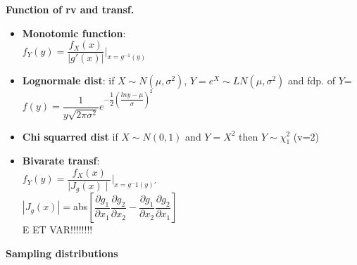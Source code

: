 \documentclass[a4paper, 10pt, landscape]{article}
\begin{document}
\begin{multicols*}{4}
\textbf{Function of rv and transf.}

\begin{itemize}
\item{\textbf{Monotomic function}: \\ \textbullet $f_Y(y)=\dfrac{f_X(x)}{|g'(x)|} |_{x=g^{-1}(y)}$}
\item{\textbf{Lognormale dist}: if $X\sim N(\mu, \sigma^2)$,  $Y=e^X \sim LN(\mu, \sigma^2)$ and fdp. of $Y$= \\
$f(y)=\dfrac{1}{y\sqrt{2\pi \sigma^2}}e^{-\dfrac{1}{2}\left( \dfrac{ln y - \mu }{\sigma} \right)^2}$}
\item{\textbf{Chi squarred dist} if $X\sim N(0,1)$ and $Y=X^2$ then $Y\sim \chi^2_1$ (v=2)}
\item{\textbf{Bivarate transf}: \\ \textbullet $f_Y(y) = \dfrac{f_X(x)}{\mid J_g(x)\mid} |_{x=g^-1(y)'}$ \\ \textbullet $|J_g(x)|=$abs$\left[ \dfrac{\partial g_1}{\partial x_1}\dfrac{\partial g_2}{\partial x_2}-\dfrac{\partial g_1}{\partial x_2}\dfrac{\partial g_2}{\partial x_1}\right]$ \\E ET VAR!!!!!!!!}
\end{itemize}

\textbf{Sampling distributions}


\end{multicols*}
\end{document}
